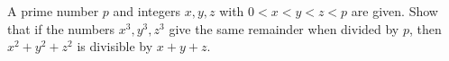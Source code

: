 A prime number $p$ and integers $x, y, z$ with $0 < x < y < z < p$ are given. Show that if the numbers $x^3, y^3, z^3$ give the same remainder when divided by $p$, then $x^2 + y^2 + z^2$ is divisible by $x + y + z.$